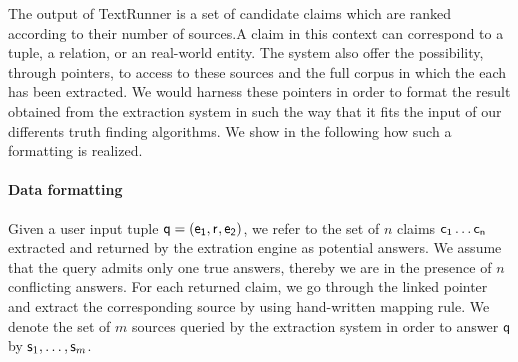The output of TextRunner is a set of candidate claims which are ranked according to their number of sources.A claim in this
context can correspond to a tuple, a relation, or an real-world entity.
The system also offer the possibility, through pointers, to access to these sources and the full corpus in which the each
has been extracted. We would harness these pointers in order to format the result obtained from the extraction system  in
such the way that it fits the input of our differents truth finding algorithms. We show in the following how such a 
formatting is realized.

\paragraph*{Data formatting}
Given a user input tuple $\mathsf{q}=(\mathsf{e_{1}}, \mathsf{r}_{},\mathsf{e_{2}})$, we refer to the
set of $n$ claims $\mathsf{c_{1}}\ldots \mathsf{c_{n}}$ extracted and returned by the
extration engine as potential answers. 
We assume that the query admits only one true answers, thereby we are in the presence of
$n$ conflicting answers. For each returned claim, we go through the linked pointer and extract the
corresponding source by using hand-written mapping rule. We denote the set of $m$ sources queried by 
the extraction system in order to answer $\mathsf{q}$ by $\mathsf{s}_{1}, \ldots, \mathsf{s}_{m}$.